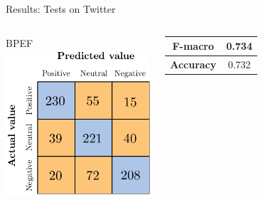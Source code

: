 \documentclass{beamer}
\begin{document}
\begin{frame}{Results: Tests on Twitter}
\begin{columns}
			\centering
			BPEF\vspace{0.7cm}\\
			\includegraphics[width=0.7\linewidth]{figures/twitter_snt_bpef_tst.pdf}\\
			\begin{table}
				\centering
				\begin{tabular}{| c | c |}
					\hline
					\textbf{F-macro} & 0.734 \\
					\hline
					\textbf{Accuracy} & 0.732 \\
					\hline
				\end{tabular}
			\end{table}
			
			
		\end{columns}
	\end{frame}
\end{document}
